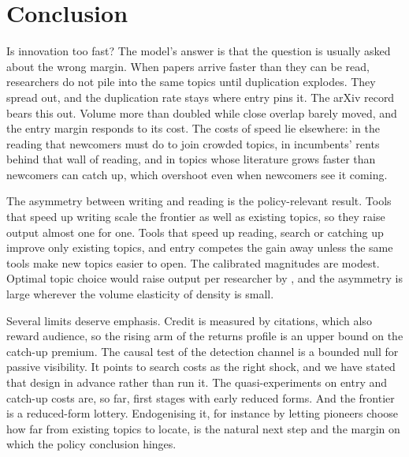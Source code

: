\section{Conclusion}\label{sec:conclusion}

Is innovation too fast? The model's answer is that the question is usually
asked about the wrong margin. When papers arrive faster than they can be read,
researchers do not pile into the same topics until duplication explodes. They
spread out, and the duplication rate stays where entry pins it. The arXiv record
bears this out. Volume more than doubled while close overlap barely moved,
and the entry margin responds to its cost. The costs of speed lie elsewhere:
in the reading that newcomers must do to join crowded topics, in incumbents'
rents behind that wall of reading, and in topics whose literature grows faster
than newcomers can catch up, which overshoot even when newcomers see it coming.

The asymmetry between writing and reading is the policy-relevant result.
Tools that speed up writing scale the frontier as well as existing topics, so
they raise output almost one for one. Tools that speed up reading, search or
catching up improve only existing topics, and entry competes the gain away
unless the same tools make new topics easier to open. The calibrated
magnitudes are modest. Optimal topic choice would raise output per researcher
by \calPlannerGain, and the asymmetry is large wherever the volume elasticity of
density is small.

Several limits deserve emphasis. Credit is measured by citations, which also
reward audience, so the rising arm of the returns profile is an upper bound on
the catch-up premium. The causal test of the detection channel is a bounded
null for passive visibility. It points to search costs as the right shock, and
we have stated that design in advance rather than run it. The quasi-experiments
on entry and catch-up costs are, so far, first stages with early reduced forms.
And the frontier is a reduced-form lottery. Endogenising it, for instance by
letting pioneers choose how far from existing topics to locate, is the natural
next step and the margin on which the policy conclusion hinges.
